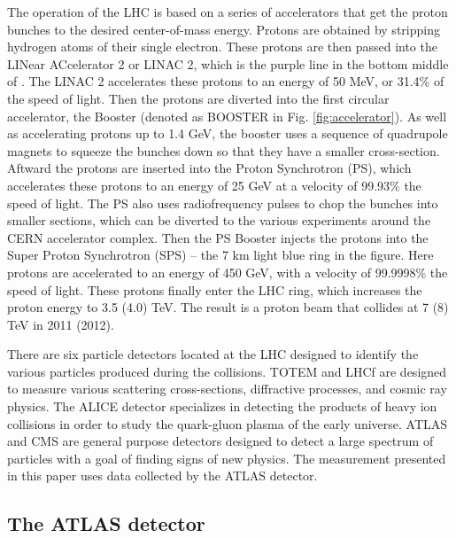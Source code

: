 The operation of the LHC is based on a series of accelerators that get the
proton bunches to the desired center-of-mass energy. Protons are obtained by
stripping hydrogen atoms of their single electron. These protons are then passed into
the LINear ACcelerator 2 or LINAC 2, which is the purple line in the bottom middle
of . The LINAC 2 accelerates these protons to an energy of
50 MeV, or 31.4\% of the speed of light. Then the protons are diverted into the
first circular accelerator, the Booster (denoted as BOOSTER
in Fig. \ref{fig:accelerator}). As well as accelerating protons up to 1.4 GeV,
the booster uses a sequence of quadrupole magnets to squeeze the bunches down 
so that they have a smaller cross-section. Aftward the protons are inserted
into the Proton Synchrotron (PS), which accelerates these protons to an energy
of 25 GeV at a velocity of 99.93\% the speed of light. The PS also uses 
radiofrequency pulses to chop the bunches into smaller sections, which can
be diverted to the various experiments around the CERN accelerator complex.
Then the PS Booster
injects the protons into the Super Proton Synchrotron (SPS) -- the 7 km light blue
ring in the figure. Here protons are accelerated to an energy of 450 GeV,
with a velocity of 99.9998\% the speed of light. These protons finally enter
the LHC ring, which increases the proton energy to 3.5 (4.0) TeV. The result
is a proton beam that collides at 7 (8) TeV in 2011 (2012).

There are six particle detectors located at the LHC designed
to identify the various particles produced during the collisions. TOTEM and LHCf
are designed to measure various scattering cross-sections, diffractive processes, 
and cosmic ray physics. The ALICE detector specializes in detecting the products
of heavy ion collisions in
order to study the quark-gluon plasma of the early universe. ATLAS and CMS 
are general purpose detectors designed to detect a large spectrum of particles
with a goal of finding signs of new physics. The measurement presented in this
paper uses data collected by the ATLAS detector.

\subsection{The ATLAS detector}
\label{subsec:atlas}

